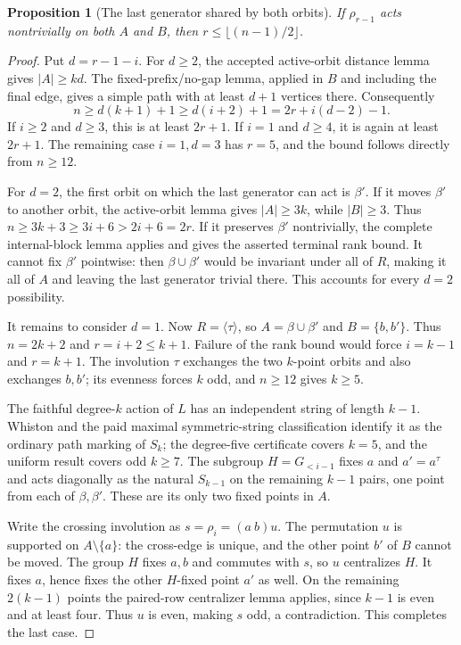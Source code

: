 \documentclass[11pt,a4paper]{article}
\newtheorem{proposition}[lemma]{Proposition}
\newcommand{\gen}[1]{\langle#1\rangle}
\begin{document}
\begin{proposition}[The last generator shared by both orbits]
\label{last}
If $\rho_{r-1}$ acts nontrivially on both $A$ and $B$, then
$r\leq\lfloor(n-1)/2\rfloor$.
\end{proposition}
\begin{proof}
Put $d=r-1-i$. For $d\geq2$, the accepted active-orbit distance
lemma gives $|A|\geq kd$. The fixed-prefix/no-gap lemma, applied
in $B$ and including the final edge, gives a simple path with
at least $d+1$ vertices there. Consequently
\[
 n\geq d(k+1)+1\geq d(i+2)+1
          =2r+i(d-2)-1.                                  \tag{1}
\]
If $i\geq2$ and $d\geq3$, this is at least $2r+1$.
If $i=1$ and $d\geq4$, it is again at least $2r+1$.
The remaining case $i=1,d=3$ has $r=5$, and the bound follows
directly from $n\geq12$.

For $d=2$, the first orbit on which the last generator can
act is $\beta'$. If it moves $\beta'$ to another orbit,
the active-orbit lemma gives $|A|\geq3k$, while $|B|\geq3$.
Thus $n\geq3k+3\geq3i+6>2i+6=2r$.
If it preserves $\beta'$ nontrivially, the complete
internal-block lemma applies and gives the asserted terminal
rank bound. It cannot fix $\beta'$ pointwise: then
$\beta\cup\beta'$ would be invariant under all of $R$,
making it all of $A$ and leaving the last generator trivial
there. This accounts for every $d=2$ possibility.

It remains to consider $d=1$. Now $R=\gen\tau$, so
$A=\beta\cup\beta'$ and $B=\{b,b'\}$.
Thus $n=2k+2$ and $r=i+2\leq k+1$. Failure of the rank bound
would force $i=k-1$ and $r=k+1$. The involution $\tau$
exchanges the two $k$-point orbits and also exchanges $b,b'$;
its evenness forces $k$ odd, and $n\geq12$ gives $k\geq5$.

The faithful degree-$k$ action of $L$ has an independent string
of length $k-1$. Whiston and the paid maximal symmetric-string
classification identify it as the ordinary path marking of
$S_k$; the degree-five certificate covers $k=5$, and the
uniform result covers odd $k\geq7$.
The subgroup $H=G_{<i-1}$ fixes $a$ and $a'=a^\tau$ and
acts diagonally as the natural $S_{k-1}$ on the remaining
$k-1$ pairs, one point from each of $\beta,\beta'$.
These are its only two fixed points in $A$.

Write the crossing involution as $s=\rho_i=(a\ b)u$.
The permutation $u$ is supported on $A\setminus\{a\}$:
the cross-edge is unique, and the other point $b'$ of $B$
cannot be moved. The group $H$ fixes $a,b$ and commutes with
$s$, so $u$ centralizes $H$. It fixes $a$, hence fixes the
other $H$-fixed point $a'$ as well. On the remaining
$2(k-1)$ points the paired-row centralizer lemma applies,
since $k-1$ is even and at least four. Thus $u$ is even,
making $s$ odd, a contradiction. This completes the last case.
\end{proof}
\end{document}
